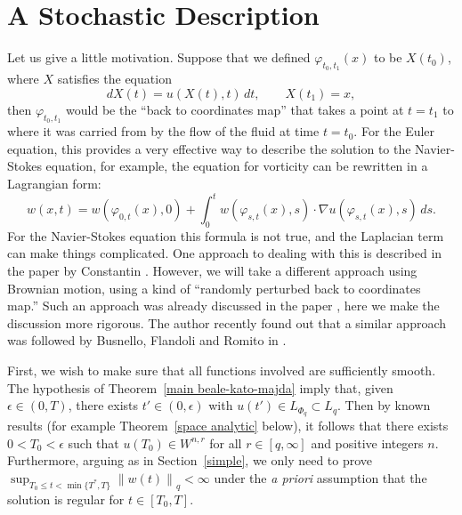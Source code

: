 \documentclass[12pt]{amsart}
\theoremstyle{remark}
\newcommand{\snormo}[1]{{\mathopen\|#1\mathclose\|}}
\begin{document}
\section{A Stochastic Description}

Let us give a little motivation.  Suppose that 
we defined $\varphi_{t_0,t_1}(x)$
to be $X(t_0)$, where $X$ satisfies
the equation
$$ dX(t) = u(X(t),t) \, dt,
   \qquad
   X(t_1) = x ,$$
then $\varphi_{t_0,t_1}$ would be the ``back to coordinates map'' that
takes a point at $t=t_1$ to where it was carried from by the flow of the
fluid at time $t=t_0$.  For the Euler equation, this provides a very effective
way to describe the solution to the Navier-Stokes equation, for example, the
equation for vorticity can be rewritten in a Lagrangian form:
$$ w(x,t) = w(\varphi_{0,t}(x),0)
   + \int_0^t w(\varphi_{s,t}(x),s) \cdot \nabla u(\varphi_{s,t}(x),s) \, ds .$$
For the Navier-Stokes equation this formula is not true, and the Laplacian term
can make things complicated.  One approach to dealing with this is described
in the paper by Constantin \cite{constantin}.  
However, we will take a different approach using Brownian motion, using a
kind of
``randomly perturbed back to coordinates map.''
Such an approach was already discussed in the paper
\cite{montgomery-smith-pokorny}, here we make the discussion more rigorous.
The author recently found out that a similar approach was followed by
Busnello, Flandoli and Romito in \cite{busnello et al}.

First, we wish to make sure that all functions involved are sufficiently
smooth.
The hypothesis of Theorem~\ref{main beale-kato-majda} imply that, 
given $\epsilon \in (0,T)$, there exists
$t' \in (0,\epsilon)$ with $u(t') \in L_{\Phi_q} \subset L_q$.
Then by known results (for example Theorem~\ref{space analytic} below), 
it follows
that there exists $0 < T_0<\epsilon$ such that 
$u(T_0) \in W^{n,r}$ for all $r \in [q,\infty]$ and positive integers $n$.
Furthermore, arguing as in Section~\ref{simple}, we only need to prove 
$\sup_{T_0 \le t < \min\{T^*,T\}} \snormo{w(t)}_q < \infty$
under the \emph{a priori} assumption that
the solution is regular for $t \in [T_0,T]$.
\end{document}
